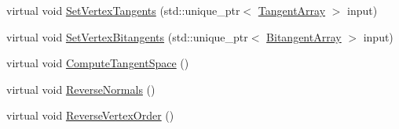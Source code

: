 \begin{DoxyCompactItemize}
virtual void \hyperlink{class_rendering_object_a041c99c6f0d570bb7c36b9d2168f0b0d}{Set\+Vertex\+Tangents} (std\+::unique\+\_\+ptr$<$ \hyperlink{class_rendering_object_a45b53e911c2f0131aa10e89869d38944}{Tangent\+Array} $>$ input)
\item 
virtual void \hyperlink{class_rendering_object_a095317dd60a7558c22409e2fabcb252e}{Set\+Vertex\+Bitangents} (std\+::unique\+\_\+ptr$<$ \hyperlink{class_rendering_object_a6c6bf305a5f0f9ce1006f374c753c856}{Bitangent\+Array} $>$ input)
\item 
virtual void \hyperlink{class_rendering_object_adec25796def807fd09a5fc4f1fbd0c41}{Compute\+Tangent\+Space} ()
\item 
virtual void \hyperlink{class_rendering_object_a761ad8574fc4424e12487512bb30067c}{Reverse\+Normals} ()
\item 
virtual void \hyperlink{class_rendering_object_a2f175770ceadac2fea979f191974665b}{Reverse\+Vertex\+Order} ()
\end{DoxyCompactItemize}
